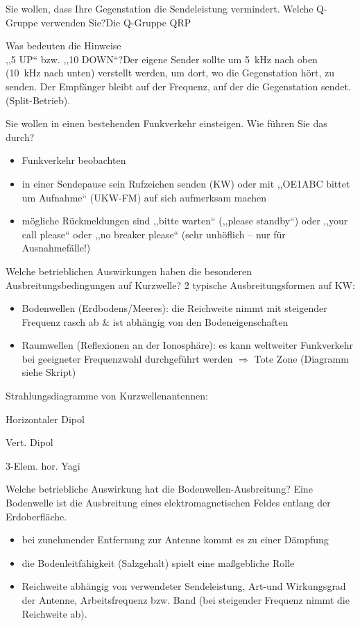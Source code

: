 \documentclass[avery5371,grid,frame,a4paper]{flashcards}
\newcommand{\card}[3]{
  \begin{flashcard}[{\chap} -- #1]{#2}#3\end{flashcard}
}
\begin{document}
\card{04}{Sie wollen, dass Ihre Gegenstation die Sendeleistung vermindert. Welche Q-Gruppe verwenden Sie?}{Die Q-Gruppe QRP}
\card{05}{Was bedeuten die Hinweise \\ ,,5 UP`` bzw. ,,10 DOWN``?}{Der eigene Sender sollte um \SI{5}{\kilo\Hz} nach oben (\SI{10}{\kilo\Hz} nach unten) verstellt werden, um dort, wo die Gegenstation hört, zu senden. Der Empfänger bleibt auf der Frequenz, auf der die Gegenstation sendet. (Split-Betrieb).}
\card{06}{Sie wollen in einen bestehenden Funkverkehr einsteigen. Wie führen Sie das durch?}{
  \begin{itemize}
    \item Funkverkehr beobachten
    \item in einer Sendepause sein Rufzeichen senden (KW) oder mit ,,OE1ABC bittet um Aufnahme`` (UKW-FM) auf sich aufmerksam machen
    \item mögliche Rückmeldungen sind ,,bitte warten`` (,,please standby``) oder ,,your call please`` oder ,,no breaker please`` (sehr unhöflich – nur für Ausnahmefälle!)
  \end{itemize}
}
\card{07}{Welche betrieblichen Auswirkungen haben die besonderen Ausbreitungsbedingungen auf Kurzwelle?}{
  \small
  2 typische Ausbreitungsformen auf KW:
  \begin{itemize}
    \item Bodenwellen (Erdbodens/Meeres): die Reichweite nimmt mit steigender Frequenz rasch ab \& ist abhängig von den Bodeneigenschaften
    \item Raumwellen (Reflexionen an der Ionosphäre): es kann weltweiter Funkverkehr bei geeigneter Frequenzwahl durchgeführt werden $\Rightarrow$ Tote Zone (Diagramm siehe Skript)
  \end{itemize}

  Strahlungsdiagramme von Kurzwellenantennen: \\
  \begin{itemize*}
    \item Horizontaler Dipol
    \item Vert. Dipol
    \item 3-Elem. hor. Yagi
  \end{itemize*}
}
\card{08}{Welche betriebliche Auswirkung hat die Bodenwellen-Ausbreitung?}{
  \small
  Eine Bodenwelle ist die Ausbreitung eines elektromagnetischen Feldes entlang der Erdoberfläche.
  \begin{itemize}
    \item bei zunehmender Entfernung zur Antenne kommt es zu einer Dämpfung
    \item die Bodenleitfähigkeit (Salzgehalt) spielt eine maßgebliche Rolle
    \item Reichweite abhängig von verwendeter Sendeleistung, Art-und Wirkungsgrad der Antenne, Arbeitsfrequenz bzw. Band (bei steigender Frequenz nimmt die Reichweite ab).
  \end{itemize}
}
\end{document}
